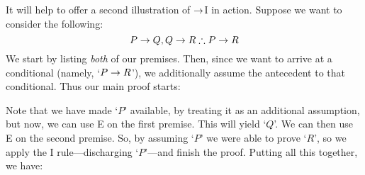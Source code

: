 It will help to offer a second  illustration of $\rightarrow$I in action. Suppose we want to consider the following:
	$$P \eif Q, Q \eif R \therefore P \eif R$$
We start by listing \emph{both} of our premises. Then, since we want to arrive at a conditional (namely, `$P \rightarrow R$'), we additionally assume the antecedent to that conditional. Thus our main proof starts:
\begin{fitchproof}
	\open
	\close
\end{fitchproof}
Note that we have made `$P$' available, by treating it as an additional assumption, but now, we can use {\eif}E on the first premise. This will yield `$Q$'. We can then use {\eif}E on the second premise. So, by assuming `$P$' we were able to prove `$R$', so we apply the {\eif}I rule---discharging `$P$'---and finish the proof. Putting all this together, we have:
\label{HSproof}
\begin{fitchproof}
	\open
	\close
\end{fitchproof}

